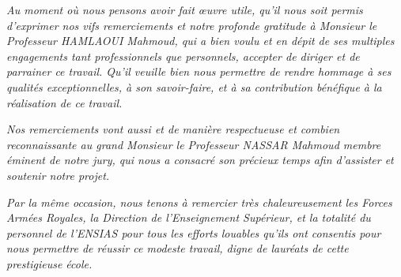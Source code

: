 \begin{center}
\textit{Au moment où nous pensons avoir fait œuvre utile, qu’il nous soit permis d’exprimer nos vifs remerciements et notre profonde gratitude à Monsieur le Professeur HAMLAOUI Mahmoud, qui a bien voulu et en dépit de ses multiples engagements tant professionnels que personnels, accepter de diriger et de parrainer ce travail. Qu’il veuille bien nous permettre de rendre hommage à ses qualités exceptionnelles, à son savoir-faire, et à sa contribution bénéfique à la réalisation de ce travail.}
\par
\textit{Nos remerciements vont aussi et de manière respectueuse et combien reconnaissante au grand Monsieur le Professeur NASSAR Mahmoud membre éminent de notre jury, qui nous a consacré son précieux temps afin d'assister et soutenir notre projet.}
\par
\textit{Par la même occasion, nous tenons à remercier très chaleureusement les Forces Armées Royales, la Direction de l’Enseignement Supérieur, et la totalité du personnel de l'ENSIAS pour tous les efforts louables qu’ils ont consentis pour nous permettre de réussir ce modeste travail, digne de lauréats de cette prestigieuse école.}
\end{center}
